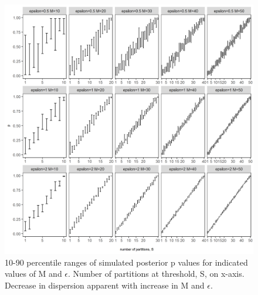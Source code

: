\documentclass[10pt, letterpaper]{article}
\begin{document}
\begin{spacing}{1.0}
\begin{figure}[]
    \centering
    \includegraphics[width=6in]{RacePayDifferential-p-Simulation-10-90-Quantiles.png}
    \caption{10-90 percentile ranges of simulated posterior p values for indicated values of M and $\epsilon$.  Number of partitions at threshold, S, on x-axis.  Decrease in dispersion apparent with increase in M and $\epsilon$.}
    \label{figure:RacePayDifferential-p-Simulation-10-90-Quantiles}
\end{figure}

\clearpage

\end{spacing}
  
\end{document}
